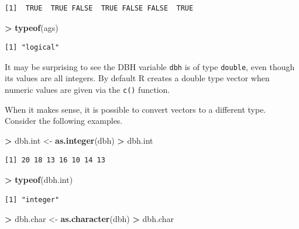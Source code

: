 \documentclass[]{krantz}
\makeatletter
\newenvironment{Shaded}{\begin{snugshade}}{\end{snugshade}}
\newcommand{\KeywordTok}[1]{\textcolor[rgb]{0.27,0.27,0.27}{\textbf{#1}}}
\newcommand{\StringTok}[1]{\textcolor[rgb]{0.5,0.5,0.5}{#1}}
\newcommand{\OperatorTok}[1]{\textcolor[rgb]{0.43,0.43,0.43}{\textbf{#1}}}
\newcommand{\NormalTok}[1]{#1}
\newenvironment{kframe}{%
\medskip{}
\setlength{\fboxsep}{.8em}
 \def\at@end@of@kframe{}%
 \ifinner\ifhmode%
  \def\at@end@of@kframe{\end{minipage}}%
  \begin{minipage}{\columnwidth}%
 \fi\fi%
 \def\FrameCommand##1{\hskip\@totalleftmargin \hskip-\fboxsep
 \colorbox{shadecolor}{##1}\hskip-\fboxsep
     \hskip-\linewidth \hskip-\@totalleftmargin \hskip\columnwidth}%
 \MakeFramed {\advance\hsize-\width
   \@totalleftmargin\z@ \linewidth\hsize
   \@setminipage}}%
 {\par\unskip\endMakeFramed%
 \at@end@of@kframe}
\renewenvironment{Shaded}{\begin{kframe}}{\end{kframe}}
\theoremstyle{definition}
\theoremstyle{definition}
\theoremstyle{definition}
\theoremstyle{remark}
\makeatother
\begin{document}
\begin{verbatim}
[1]  TRUE  TRUE FALSE  TRUE FALSE FALSE  TRUE
\end{verbatim}

\begin{Shaded}
\begin{Highlighting}[]
\OperatorTok{>}\StringTok{ }\KeywordTok{typeof}\NormalTok{(ags)}
\end{Highlighting}
\end{Shaded}

\begin{verbatim}
[1] "logical"
\end{verbatim}

It may be surprising to see the DBH variable \texttt{dbh} is of type
\texttt{double}, even though its values are all integers. By default R
creates a double type vector when numeric values are given via the
\texttt{c()} function.

When it makes sense, it is possible to convert vectors to a different
type. Consider the following examples.

\begin{Shaded}
\begin{Highlighting}[]
\OperatorTok{>}\StringTok{ }\NormalTok{dbh.int <-}\StringTok{ }\KeywordTok{as.integer}\NormalTok{(dbh)}
\OperatorTok{>}\StringTok{ }\NormalTok{dbh.int}
\end{Highlighting}
\end{Shaded}

\begin{verbatim}
[1] 20 18 13 16 10 14 13
\end{verbatim}

\begin{Shaded}
\begin{Highlighting}[]
\OperatorTok{>}\StringTok{ }\KeywordTok{typeof}\NormalTok{(dbh.int)}
\end{Highlighting}
\end{Shaded}

\begin{verbatim}
[1] "integer"
\end{verbatim}

\begin{Shaded}
\begin{Highlighting}[]
\OperatorTok{>}\StringTok{ }\NormalTok{dbh.char <-}\StringTok{ }\KeywordTok{as.character}\NormalTok{(dbh)}
\OperatorTok{>}\StringTok{ }\NormalTok{dbh.char}
\end{Highlighting}
\end{Shaded}
\end{document}
